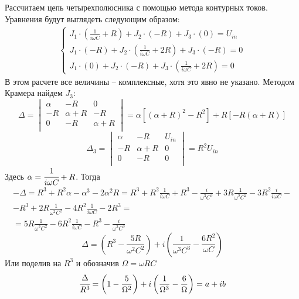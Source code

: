 Рассчитаем цепь четырехполюсника с помощью метода контурных токов. Уравнения будут выглядеть следующим образом:
\begin{gather}
	\left\{
	\begin{aligned}
		J_1\cdot\left(\frac{1}{i\omega C}+R\right)+J_2\cdot\left( -R \right)+J_3\cdot\left(0 \right)=U_{in}\\
		J_1\cdot\left(-R\right)+J_2\cdot\left( \frac{1}{i\omega C}+2R \right)+J_3\cdot\left(-R \right)=0\\
		J_1\cdot\left(0\right)+J_2\cdot\left( -R \right)+J_3\cdot\left(\frac{1}{i\omega C}+2R \right)=0
	\end{aligned}
	\right.
\end{gather}
В этом расчете все величины -- комплексные, хотя это явно не указано. Методом Крамера найдем $J_3$:
\begin{equation}
\Delta =\begin{vmatrix} 
		\alpha & -R & 0\\
		-R & \alpha+R & -R\\
		0 & -R & \alpha+R\\
	\end{vmatrix}=
\alpha[(\alpha+R)^2-R^2]+R[-R(\alpha+R)]
\end{equation}
\begin{equation}
\Delta_3 =\begin{vmatrix} 
		\alpha & -R & U_{in}\\
		-R & \alpha+R & 0\\
		0 & -R & 0\\
	\end{vmatrix}=
R^2U_{in}
\end{equation}
Здесь $\alpha=\cfrac{1}{i\omega C}+R$. Тогда
\begin{multline}
	-\Delta=R^3+R^2\alpha-\alpha^3-2\alpha^2R=
	R^3
	+R^2\frac{1}{i\omega C}
	+R^3
	-\frac{i}{\omega^3C^3}
	+3R\frac{1}{\omega^2C^2}
	-3R^2\frac{i}{i\omega C}
	-\\-R^3
	+2R\frac{1}{\omega^2C^2}
	-4R^2\frac{1}{i\omega C}
	-2R^3
	=\\=
	5R\frac{1}{\omega^2C^2}
	-6R^2\frac{1}{i\omega C}
	-R^3
	-\frac{i}{\omega^3 C^3}	
\end{multline}
\begin{equation}
	\Delta=
	\left(
	R^3
	-\frac{5R}{\omega^2C^2}
	\right)
	+i
	\left(
	\frac{1}{\omega^3C^3}
	-\frac{6R^2}{\omega C}
	\right)	
\end{equation}
Или поделив на $R^3$ и обозначив $\Omega=\omega RC$
\begin{equation}
	\cfrac{\Delta}{R^3}=
	\left(
	1
	-\frac{5}{\Omega^2}
	\right)
	+i
	\left(
	\frac{1}{\Omega^3}
	-\frac{6}{\Omega}
	\right)=a+ib
\end{equation}

